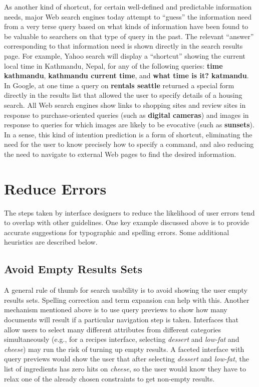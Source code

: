 \documentclass[sigconf,nonacm,screen,pbalance]{acmart}
\begin{document}
As another kind of shortcut, for certain well-defined and predictable information needs, major Web search
engines today attempt to ``guess'' the information need from a very terse query based on what kinds of
information have been found to be valuable to searchers on that type of query in the past. The relevant
``answer'' corresponding to that information need is shown directly in the search results page. For example,
Yahoo search will display a ``shortcut'' showing the current local time in Kathmandu, Nepal, for any of the
following queries: {\bf  time kathmandu}, {\bf  kathmandu current time}, and {\bf  what time is it?
katmandu}. In Google, at one time a query on {\bf  rentals seattle} returned a special form directly
in the results list that allowed the user to specify details of a housing search. All Web search engines
show links to shopping sites and review sites in response to purchase-oriented queries (such as {\bf 
digital cameras}) and images in response to queries for which images are likely to be evocative (such
as {\bf  sunsets}). In a sense, this kind of intention prediction is a form of shortcut, eliminating the
need for the user to know precisely how to specify a command, and also reducing the need to navigate to
external Web pages to find the desired information.

\section{Reduce Errors}

The steps taken by interface designers to reduce the likelihood of user errors tend to overlap with other
guidelines. One key example discussed above is to provide accurate suggestions for typographic and
spelling errors. Some additional heuristics are described below.

\subsection{Avoid Empty Results Sets}

A general rule of thumb for search usability is to avoid showing the user empty results sets. Spelling
correction and term expansion can help with this. Another mechanism mentioned above is to use query
previews to show how many documents will result if a particular navigation step is taken. Interfaces
that allow users to select many different attributes from different categories simultaneously (e.g., for
a recipes interface, selecting {\em  dessert} and {\em  low-fat} and {\em  cheese}) may run the risk
of turning up empty results. A faceted interface with query previews would show the user that after
selecting {\em  dessert} and {\em  low-fat}, the list of ingredients has zero hits on {\em  cheese},
so the user would know they have to relax one of the already chosen constraints to get non-empty
results.
\end{document}

